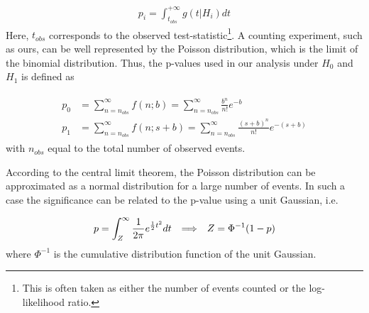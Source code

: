 \documentclass[12pt,a4paper]{amsart}
\begin{document}
\begin{align}
p_i = \int_{t_{obs}}^{+\infty} g(t|H_i)dt	\label{eq:p_value_continuos}
\end{align}
Here, $t_{obs}$ corresponds to the observed test-statistic\footnote{This is often taken as either the number of events counted or the log-likelihood ratio.}.
A counting experiment, such as ours, can be well represented by the Poisson distribution, which is the limit of the binomial distribution. Thus, the p-values used in our analysis under $H_0$ and $H_1$ is defined as

\begin{align}
\begin{split}
	p_0 &= \sum_{n=n_{obs}}^\infty f(n;b) = \sum_{n=n_{obs}}^\infty \frac{b^n}{n!}e^{-b} \label{eq:p_value_discrete_poisson}\\
	p_1 &= \sum_{n=n_{obs}}^\infty f(n;s+b) = \sum_{n=n_{obs}}^\infty \frac{(s+b)^n}{n!}e^{-(s+b)}
\end{split}
\end{align}
with $n_{obs}$ equal to the total number of observed events.

According to the central limit theorem, the Poisson distribution can be approximated as a normal distribution for a large number of events. In such a case the significance can be related to the p-value using a unit Gaussian, i.e.

\begin{align}
p = \int_Z^\infty\frac{1}{2\pi} e^{\frac{1}{2}t^2}dt \hspace{.25cm} \Longrightarrow \hspace{.25cm} Z = \Phi^{-1}(1-p)\label{eq:significance}
\end{align}
where $\Phi^{-1}$ is the cumulative distribution function of the unit Gaussian. 
\end{document}
